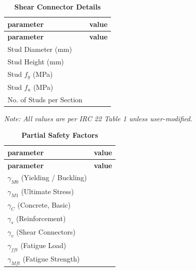 \documentclass[12pt,a4paper]{report}
\numberwithin{table}{chapter}
\numberwithin{figure}{chapter}
\begin{document}
\label{subsec:shear-connectors}

\vspace{2.2em}

\vspace{0.4em}
\begin{longtable}{|L{5.5cm}|p{10.0cm}|}
\caption{\textbf{Shear Connector Details}}
\hline
{} \textbf{parameter} & \textbf{value} \\
\hline
\endfirsthead
\hline
{} \textbf{parameter} & \textbf{value} \\
\hline
\endhead
\textnormal{Stud Diameter (mm)} &  \\[6pt]
\hline
\textnormal{Stud Height (mm)} &  \\[6pt]
\hline
\textnormal{Stud $f_y$ (MPa)} &  \\[6pt]
\hline
\textnormal{Stud $f_u$ (MPa)} &  \\[6pt]
\hline
\textnormal{No. of Studs per Section} &  \\[6pt]
\hline
\end{longtable}



\label{subsec:safety-factors}

\vspace{2.2em}

\vspace{0.3em}
\noindent\textit{Note: All values are per IRC 22 Table 1 unless user-modified.}

\vspace{0.4em}
\begin{longtable}{|L{5.5cm}|p{10.0cm}|}
\caption{\textbf{Partial Safety Factors}}
\hline
{} \textbf{parameter} & \textbf{value} \\
\hline
\endfirsthead
\hline
{} \textbf{parameter} & \textbf{value} \\
\hline
\endhead
\textnormal{$\gamma_{M0}$ (Yielding / Buckling)} &  \\[6pt]
\hline
\textnormal{$\gamma_{M1}$ (Ultimate Stress)} &  \\[6pt]
\hline
\textnormal{$\gamma_C$ (Concrete, Basic)} &  \\[6pt]
\hline
\textnormal{$\gamma_s$ (Reinforcement)} &  \\[6pt]
\hline
\textnormal{$\gamma_v$ (Shear Connectors)} &  \\[6pt]
\hline
\textnormal{$\gamma_{fft}$ (Fatigue Load)} &  \\[6pt]
\hline
\textnormal{$\gamma_{Mft}$ (Fatigue Strength)} &  \\[6pt]
\hline
\end{longtable}
\end{document}
